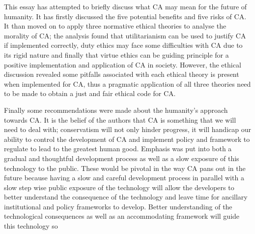 This essay has attempted to briefly discuss what CA may mean for the future of humanity. It has firstly discussed the five potential benefits and five risks of CA. It than moved on to apply three normative ethical theories to analyse the morality of CA; the analysis found that utilitarianism can be used to justify CA if implemented correctly, duty ethics may face some difficulties with CA due to its rigid nature and finally that virtue ethics can be guiding principle for a positive implementation and application of CA in society. However, the ethical discussion revealed some pitfalls associated with each ethical theory is present when implemented for CA, thus a pragmatic application of all three theories need to be made to obtain a just and fair ethical code for CA.

Finally some recommendations were made about the humanity's approach towards CA. It is the belief of the authors that CA is something that we will need to deal with; conservatism will not only hinder progress, it will handicap our ability to control the development of CA and implement policy and framework to regulate to lead to the greatest human good. Emphasis was put into both a gradual and thoughtful development process as well as a slow exposure of this technology to the public. These would be pivotal in the way CA pans out in the future because having a slow and careful development process in parallel with a slow step wise public exposure of the technology will allow the developers to better understand the consequence of the technology and leave time for ancillary institutional and policy frameworks to develop. Better understanding of the technological consequences as well as an accommodating framework will guide this technology so 
